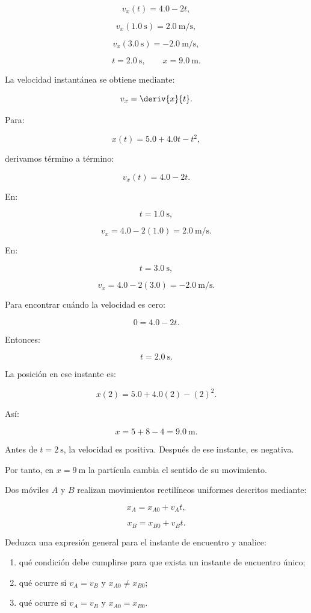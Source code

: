 \begin{respuesta}
\[
v_x(t)=4.0-2t,
\]

\[
v_x(\SI{1.0}{\second})=\SI{2.0}{\meter\per\second},
\]

\[
v_x(\SI{3.0}{\second})=-\SI{2.0}{\meter\per\second},
\]

\[
t=\SI{2.0}{\second},
\qquad
x=\SI{9.0}{\meter}.
\]
\end{respuesta}

\begin{explicacion}
La velocidad instantánea se obtiene mediante:

\[ v_x=\deriv{x}{t}. \]

Para:

\[ x(t)=5.0+4.0t-t^2, \]

derivamos término a término:

\[ \boxed{v_x(t)=4.0-2t}. \]

En:

\[ t=\SI{1.0}{\second}, \]

\[
v_x
=
4.0-2(1.0)
=
\boxed{\SI{2.0}{\meter\per\second}}.
\]

En:

\[ t=\SI{3.0}{\second}, \]

\[
v_x
=
4.0-2(3.0)
=
\boxed{-\SI{2.0}{\meter\per\second}}.
\]

Para encontrar cuándo la velocidad es cero:

\[
0=4.0-2t.
\]

Entonces:

\[ \boxed{t=\SI{2.0}{\second}}. \]

La posición en ese instante es:

\[
x(2)
=
5.0+4.0(2)-(2)^2.
\]

Así:

\[
x
=
5+8-4
=
\boxed{\SI{9.0}{\meter}}.
\]

Antes de \(t=\SI{2}{\second}\), la velocidad es positiva. Después de ese instante, es negativa.

Por tanto, en \(x=\SI{9}{\meter}\) la partícula cambia el sentido de su movimiento.
\end{explicacion}


\nivelavanzado


\begin{ejercicio}
Dos móviles \(A\) y \(B\) realizan movimientos rectilíneos uniformes descritos mediante:

\[
x_A=x_{A0}+v_At,
\]

\[
x_B=x_{B0}+v_Bt.
\]

Deduzca una expresión general para el instante de encuentro y analice:

\begin{enumerate}[label=\alph*)]
    \item qué condición debe cumplirse para que exista un instante de encuentro único;
    \item qué ocurre si \(v_A=v_B\) y \(x_{A0}\neq x_{B0}\);
    \item qué ocurre si \(v_A=v_B\) y \(x_{A0}=x_{B0}\).
\end{enumerate}
\end{ejercicio}

